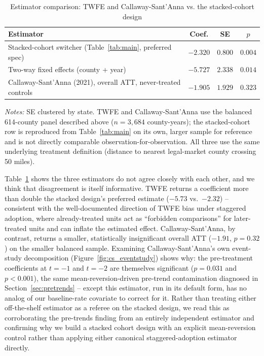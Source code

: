 \documentclass[11pt]{article}
\begin{document}
\begin{table}[htbp]
\centering
\caption{Estimator comparison: TWFE and Callaway-Sant'Anna vs. the stacked-cohort design}
\label{tab:twfecs}
\begin{tabular}{@{}lccc@{}}
\toprule
Estimator & Coef. & SE & $p$ \\
\midrule
Stacked-cohort switcher (Table~\ref{tab:main}, preferred spec) & $-2.320$ & $0.800$ & $0.004$ \\
Two-way fixed effects (county + year) & $-5.727$ & $2.338$ & $0.014$ \\
Callaway-Sant'Anna (2021), overall ATT, never-treated controls & $-1.905$ & $1.929$ & $0.323$ \\
\bottomrule
\end{tabular}
\vspace{2pt}
\begin{minipage}{0.92\textwidth}
\footnotesize\emph{Notes:} SE clustered by state. TWFE and
Callaway-Sant'Anna use the balanced 614-county panel described above
($n=3{,}684$ county-years); the stacked-cohort row is reproduced from
Table~\ref{tab:main} on its own, larger sample for reference and is not
directly comparable observation-for-observation. All three use the
same underlying treatment definition (distance to nearest legal-market
county crossing 50 miles).
\end{minipage}
\end{table}

Table~\ref{tab:twfecs} shows the three estimators do not agree closely
with each other, and we think that disagreement is itself informative.
TWFE returns a coefficient more than double the stacked design's
preferred estimate ($-5.73$ vs.\ $-2.32$) -- consistent with the
well-documented direction of TWFE bias under staggered adoption, where
already-treated units act as ``forbidden comparisons'' for later-treated
units and can inflate the estimated effect. Callaway-Sant'Anna, by
contrast, returns a smaller, statistically insignificant overall ATT
($-1.91$, $p=0.32$) on the smaller balanced sample. Examining
Callaway-Sant'Anna's own event-study decomposition
(Figure~\ref{fig:cs_eventstudy}) shows why: the pre-treatment
coefficients at $t=-1$ and $t=-2$ are themselves significant
($p=0.031$ and $p<0.001$), the same mean-reversion-driven pre-trend
contamination diagnosed in Section~\ref{sec:pretrends} -- except this
estimator, run in its default form, has no analog of our baseline-rate
covariate to correct for it. Rather than treating either off-the-shelf
estimator as a referee on the stacked design, we read this as
corroborating the pre-trends finding from an entirely independent
estimator and confirming why we build a stacked cohort design with an
explicit mean-reversion control rather than applying either canonical
staggered-adoption estimator directly.
\end{document}
